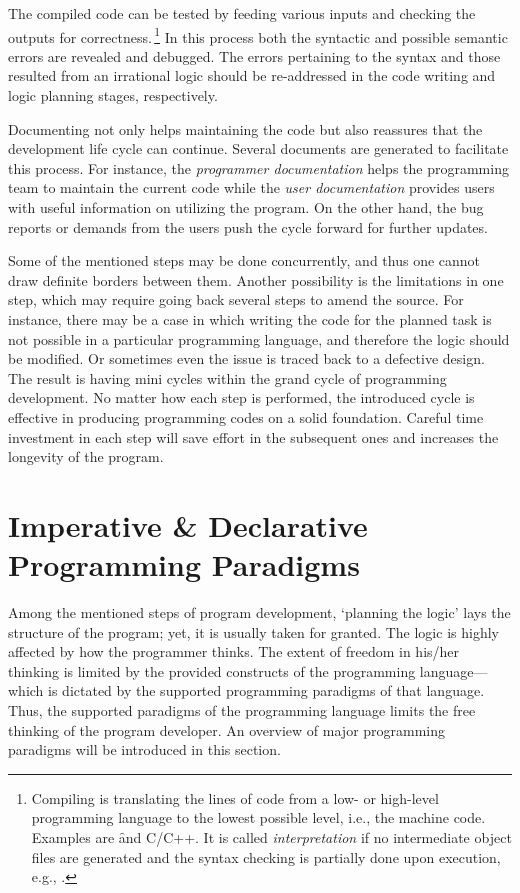 	The compiled code can be tested by feeding various inputs and checking the outputs for correctness.\,\footnote{Compiling is translating the lines of code from a low- or high-level programming language to the lowest possible level, i.e., the machine code. Examples are \f and C/C++. It is called \textit{interpretation} if no intermediate object files are generated and the syntax checking is partially done upon execution, e.g., \py.} In this process both the syntactic and possible semantic errors are revealed and debugged. The errors pertaining to the syntax and those resulted from an irrational logic should be re-addressed in the code writing and logic planning stages, respectively.
	
	Documenting not only helps maintaining the code but also reassures that the development life cycle can continue. Several documents are generated to facilitate this process. For instance, the \textit{programmer documentation} helps the programming team to maintain the current code while the \textit{user documentation} provides users with useful information on utilizing the program. On the other hand, the bug reports or demands from the users push the cycle forward for further updates.
	
	Some of the mentioned steps may be done concurrently, and thus one cannot draw definite borders between them. Another possibility is the limitations in one step, which may require going back several steps to amend the source. For instance, there may be a case in which writing the code for the planned task is not possible in a particular programming language, and therefore the logic should be modified. Or sometimes even the issue is traced back to a defective design. The result is having mini cycles within the grand cycle of programming development. No matter how each step is performed, the introduced cycle is effective in producing programming codes on a solid foundation. Careful time investment in each step will save effort in the subsequent ones and increases the longevity of the program. 

\section{Imperative \& Declarative Programming Paradigms}
	Among the mentioned steps of program development, `planning the logic' lays the structure of the program; yet, it is usually taken for granted. The logic is highly affected by how the programmer thinks. The extent of freedom in his/her thinking is limited by the provided constructs of the programming language---which is dictated by the supported programming paradigms of that language. Thus, the supported paradigms of the programming language limits the free thinking of the program developer. An overview of major programming paradigms will be introduced in this section.

